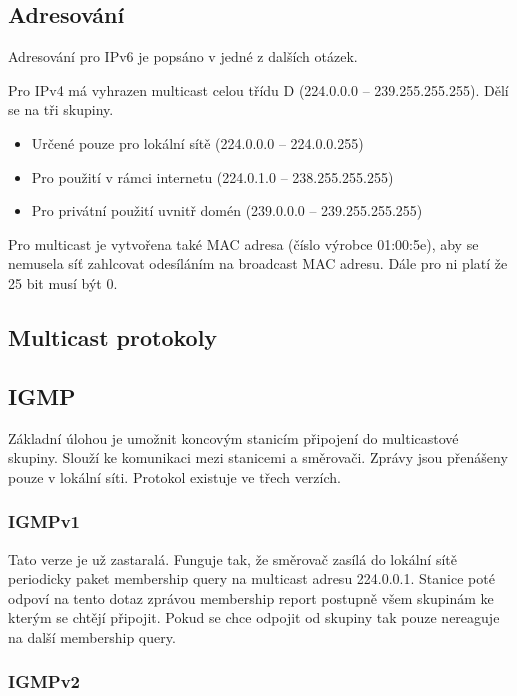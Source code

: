 \subsection{Adresování}

Adresování pro IPv6 je popsáno v jedné z dalších otázek.

Pro IPv4 má vyhrazen multicast celou třídu D (224.0.0.0 -- 239.255.255.255).
Dělí se na tři skupiny.
\begin{itemize}[noitemsep]
    \item Určené pouze pro lokální sítě (224.0.0.0 -- 224.0.0.255)
    \item Pro použití v rámci internetu (224.0.1.0 -- 238.255.255.255)
    \item Pro privátní použití uvnitř domén (239.0.0.0 -- 239.255.255.255) 
\end{itemize}

Pro multicast je vytvořena také MAC adresa (číslo výrobce 01:00:5e), aby se nemusela síť zahlcovat odesíláním na broadcast MAC adresu.
Dále pro ni platí že 25 bit musí být 0.

\subsection{Multicast protokoly}

\subsection{IGMP}

Základní úlohou je umožnit koncovým stanicím připojení do multicastové skupiny.
Slouží ke komunikaci mezi stanicemi a směrovači.
Zprávy jsou přenášeny pouze v lokální síti.
Protokol existuje ve třech verzích.

\subsubsection{IGMPv1}

Tato verze je už zastaralá.
Funguje tak, že směrovač zasílá do lokální sítě periodicky paket membership query na multicast adresu 224.0.0.1.
Stanice poté odpoví na tento dotaz zprávou membership report postupně všem skupinám ke kterým se chtějí připojit.
Pokud se chce odpojit od skupiny tak pouze nereaguje na další membership query.

\subsubsection{IGMPv2}

